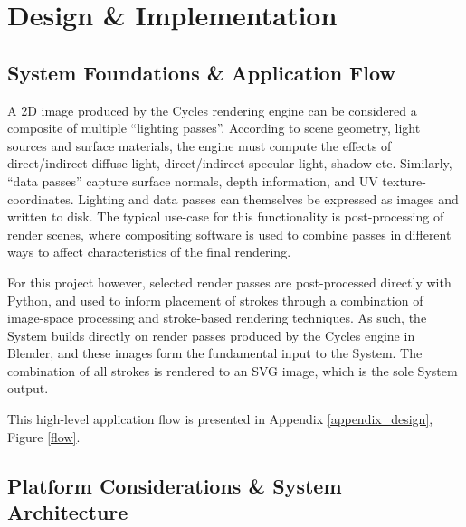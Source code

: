 


\chapter{Design \& Implementation}\label{design_implementation}

\section{System Foundations \& Application Flow}

A 2D image produced by the Cycles rendering engine can be considered a composite of multiple ``lighting passes''.
According to scene geometry, light sources and surface materials, the engine must compute the effects of direct/indirect diffuse light, direct/indirect specular light, shadow etc.
Similarly, ``data passes'' capture surface normals, depth information, and UV texture-coordinates.
Lighting and data passes can themselves be expressed as images and written to disk.
The typical use-case for this functionality is post-processing of render scenes, where compositing software is used to combine passes in different ways to affect characteristics of the final rendering.

For this project however, selected render passes are post-processed directly with Python, and used to inform placement of strokes through a combination of image-space processing and stroke-based rendering techniques. As such, the System builds directly on render passes produced by the Cycles engine in Blender, and these images form the fundamental input to the System. The combination of all strokes is rendered to an SVG image, which is the sole System output.

This high-level application flow is presented in Appendix \ref{appendix_design}, Figure \ref{flow}.

\section{Platform Considerations \& System Architecture}

